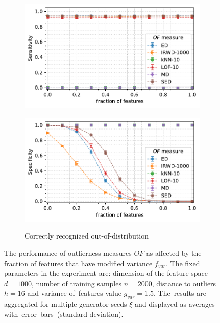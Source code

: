 \begin{figure}[t]
\begin{subfigure}[b]{0.495\textwidth}
        \includegraphics[width=\textwidth]{images/variances/f_var/trend-variances-sens_95(n_varied)-variance_1.50-distance_16-outliers_varied_False-model_ED,IRWD-1000,kNN-10,LOF-10,MD,SED-aggregated.pdf}
        \label{fig:n_varied-sensitivity}
    \end{subfigure}
    \hfill
    \begin{subfigure}[b]{0.495\textwidth}
        \centering
        \caption{\small Correctly recognized out-of-distribution}
        \includegraphics[width=\textwidth]{images/variances/f_var/trend-variances-spec_95(n_varied)-variance_1.50-distance_16-outliers_varied_False-model_ED,IRWD-1000,kNN-10,LOF-10,MD,SED-aggregated.pdf}
        \label{fig:n_varied-specificity}
    \end{subfigure}
    \caption{The performance of outlierness measures $OF$ as affected by the fraction of features that have modified variance $f_{var}$. The fixed parameters in the experiment are: dimension of the feature space $d = 1000$, number of training samples $n = 2000$, distance to outliers $h = 16$ and variance of~features value $g_{var} = 1.5$. The~results are aggregated for multiple generator seeds $\xi$ and displayed as averages with~error~bars~(standard deviation).}
    \label{fig:n_varied}
    \vspace{-2.3em}
\end{figure}

